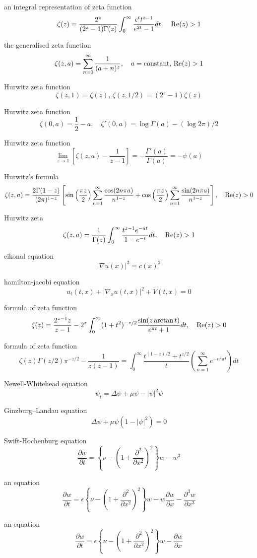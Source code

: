 an integral representation of zeta function
$$
\zeta(z)=\frac{2^z}{(2^z-1)\Gamma(z)}\int^\infty_0\frac{e^t t^{z-1}}{e^{2t}-1}dt, \quad {\rm Re}(z)>1
$$

the generalised zeta function
$$
\zeta(z,a)=\sum^\infty_{n=0}\frac{1}{(a+n)^z},\quad a={\rm constant},\,{\rm Re}(z)>1
$$

Hurwitz zeta function
$$
\zeta(z,1)=\zeta(z),\,\zeta(z,1/2)=(2^z-1)\zeta(z)
$$

Hurwitz zeta function
$$
\zeta(0,a)=\frac{1}{2}-a, \quad \zeta'(0,a)=\log\Gamma(a)-(\log 2\pi)/2
$$

Hurwitz zeta function
$$
\lim_{z\rightarrow 1}\left[\zeta(z,a)-\frac{1}{z-1}\right]=-\frac{\Gamma'(a)}{\Gamma(a)}=-\psi(a)
$$

Hurwitz’s formula
$$
\zeta(z,a)=\frac{2\Gamma(1-z)}{(2\pi)^{1-z}}\left[\sin\left(\frac{\pi z}{2}\right)\sum^\infty_{n=1}\frac{\cos(2n\pi a)}{n^{1-z}}+\cos\left(\frac{\pi z}{2}\right)\sum^\infty_{n=1}\frac{\sin(2n\pi a)}{n^{1-z}}\right], \quad {\rm Re}(z)>0
$$

Hurwitz zeta
$$
\zeta(z,a)=\frac{1}{\Gamma(z)}\int^\infty_0\frac{t^{z-1}e^{-at}}{1-e^{-t}}dt, \quad {\rm Re}(z)>1
$$

eikonal equation
$$
\left|\nabla u(x)\right|^2=c(x)^2
$$

hamilton-jacobi equation
$$
u_t(t,x)+\left|\nabla_x u(t,x)\right|^2+V(t,x)=0
$$

formula of zeta function
$$
\zeta(z)=\frac{2^{z-1}z}{z-1}-2^z\int^\infty_0 (1+t^2)^{-z/2}\frac{\sin(z \arctan t)}{e^{\pi t}+1}dt, \quad {\rm Re}(z)>0
$$

formula of zeta function
$$
\zeta(z)\Gamma(z/2)\pi^{-z/2}-\frac{1}{z(z-1)}=\int^\infty_0 \frac{t^{(1-z)/2}+t^{z/2}}{t}\left(\sum^\infty_{n=1}e^{-n^2\pi t}\right)dt
$$

Newell-Whitehead equation
$$
\psi_t=\Delta \psi+\mu\psi-|\psi|^2\psi
$$

Ginzburg–Landau equation
$$
\Delta \psi+\mu\psi(1-|\psi|^2)=0
$$

Swift-Hochenburg equation
$$
\frac{\partial w}{\partial t}=\left\{\nu-\left(1+\frac{\partial^2}{\partial x^2}\right)^2\right\}w-w^3
$$

an equation
$$
\frac{\partial w}{\partial t}=\epsilon\left\{\nu-\left(1+\frac{\partial^2}{\partial x^2}\right)^2\right\}w-w\frac{\partial w}{\partial x}-\frac{\partial^3 w}{\partial x^3}
$$

an equation
$$
\frac{\partial w}{\partial t}=\epsilon\left\{\nu-\left(1+\frac{\partial^2}{\partial x^2}\right)^2\right\}w-\frac{\partial w}{\partial x}
$$


